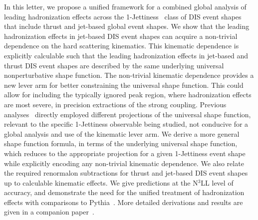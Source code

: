 \documentclass[prd,aps,nofootinbib,twocolumn,showpacs,amsmath,superscriptaddress]{revtex4-2}
\begin{document}
In this letter, we propose a unified framework  for a combined global analysis of leading hadronization effects across the  1-Jettiness~\cite{Kang:2012zr,Kang:2013wca,Kang:2013nha,Kang:2013lga,Kang:2014qba,Chu:2022jgs,Cao:2024ota,Ee:2025scz,Chien:2025rbp,Dotson:2026ttc} class of DIS event shapes that include  thrust and jet-based global event shapes.  We show that the leading hadronization effects in jet-based DIS event shapes can acquire a non-trivial dependence on the hard scattering kinematics. This kinematic dependence is explicitly calculable such that the leading hadronization effects in jet-based and  thrust DIS event shapes are described by the same underlying  universal nonperturbative shape function. The non-trivial kinematic dependence provides a new lever arm for better constraining the universal shape function.  This could allow for including the typically ignored peak region,
where hadronization effects are most severe, in precision extractions of the strong coupling.  Previous analyses~\cite{Kang:2012zr,Kang:2013wca,Kang:2013nha,Cao:2024ota,Ee:2025scz}  directly employed different projections of the universal shape function, relevant to the specific  1-Jettiness observable being studied, not conducive for a global analysis and use of the  kinematic lever arm. We derive a more general shape function formula, in terms of the underlying universal shape function,  which reduces to the appropriate projection for a given 1-Jettiness event shape while explicitly encoding any non-trivial kinematic dependence. We also relate the required renormalon subtractions for thrust and jet-based  DIS event shapes up to calculable kinematic  effects. We give predictions at the N$^3$LL level of accuracy, and demonstrate the need for the unified treatment of hadronization effects with comparisons to Pythia~\cite{Sj_strand_2015,Bierlich:2022pfr}. More detailed derivations and  results are given in a companion paper~\cite{companion:2026}.
\end{document}
